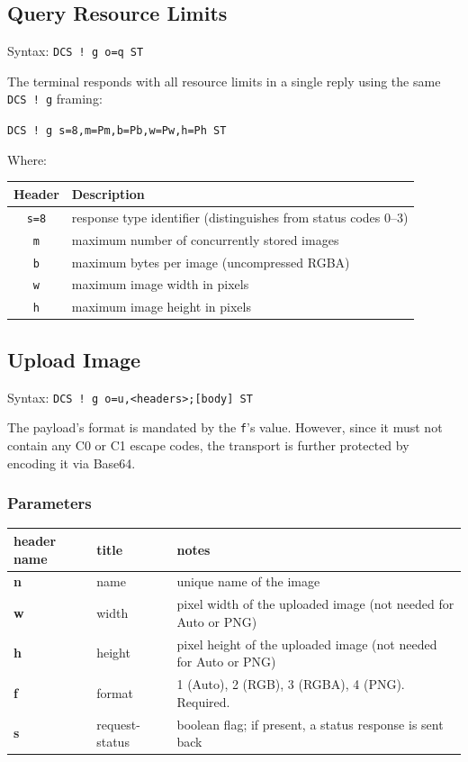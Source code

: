 \documentclass[a4paper]{article}
\newcommand{\code}[1]{\colorbox{light-gray}{\texttt{#1}}}
\begin{document}
\subsection{Query Resource Limits} %

Syntax: \code{DCS ! g o=q ST}

The terminal responds with all resource limits in a single reply
using the same \code{DCS ! g} framing:

\code{DCS ! g s=8,m=Pm,b=Pb,w=Pw,h=Ph ST}

Where:

\begin{tabular}{ |c|l| }
    \hline
    \textbf{Header} & \textbf{Description} \\
    \hline
    \code{s=8} & response type identifier (distinguishes from status codes 0--3) \\
    \code{m}   & maximum number of concurrently stored images \\
    \code{b}   & maximum bytes per image (uncompressed RGBA) \\
    \code{w}   & maximum image width in pixels \\
    \code{h}   & maximum image height in pixels \\
    \hline
\end{tabular}

\subsection{Upload Image} %

Syntax: \code{DCS ! g o=u,<headers>;[body] ST}

The payload's format is mandated by the \code{f}'s value. However, since it must not contain
any C0 or C1 escape codes, the transport is further protected by encoding it via Base64.

\subsubsection*{Parameters}

\begin{tabular}{|m{3cm}|m{2cm}|m{11cm}|}
    \hline
    \textbf{header name}   & \textbf{title}   & \textbf{notes} \\
    \hline
    \textbf{n}             & name             & unique name of the image \\
    \textbf{w}             & width            & pixel width of the uploaded image (not needed for Auto or PNG) \\
    \textbf{h}             & height           & pixel height of the uploaded image (not needed for Auto or PNG) \\
    \textbf{f}             & format           & 1 (Auto), 2 (RGB), 3 (RGBA), 4 (PNG). Required. \\
    \textbf{s}             & request-status   & boolean flag; if present, a status response is sent back \\
    \hline
\end{tabular}
\end{document}
